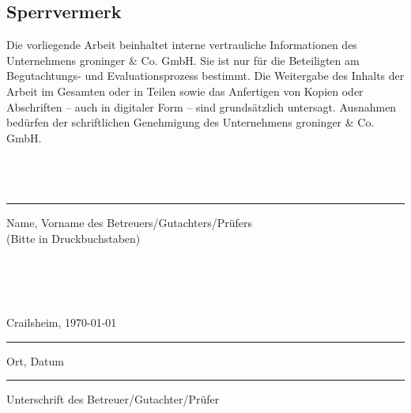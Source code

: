 \newpage
\setcounter{page}{2}

% 

% 

\subsection*{Sperrvermerk}
Die vorliegende Arbeit beinhaltet interne vertrauliche Informationen des Unternehmens groninger \& Co. GmbH. Sie ist nur für die Beteiligten am Begutachtungs- und Evaluationsprozess bestimmt. Die Weitergabe des Inhalts der Arbeit im Gesamten oder in Teilen sowie das Anfertigen von Kopien oder Abschriften – auch in digitaler Form – sind grundsätzlich untersagt. Ausnahmen bedürfen der schriftlichen Genehmigung des Unternehmens groninger \& Co. GmbH. \\ \\ \\ \\

\hspace{2cm}
\parbox{9cm}{\centering \hrule
\strut \centering\footnotesize Name, Vorname des Betreuers/Gutachters/Prüfers \\ (Bitte in Druckbuchstaben)} \\ \\ \\

\parbox[t][][t]{5cm}{\centering Crailsheim, \today \hrule \strut \centering \footnotesize Ort, Datum} %
\hspace{3cm}
\parbox[t][][t]{5cm}{\vspace{0.09cm} \hrule \strut \centering \footnotesize  Unterschrift des Betreuer/Gutachter/Prüfer}
